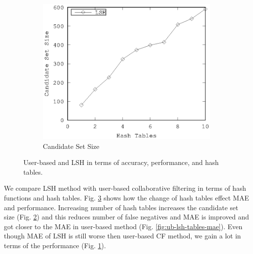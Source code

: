 \documentclass[conference]{IEEEtran}
\begin{document}
\begin{figure}[!h]
\begin{subfigure}[b]{0.225\textwidth}
                \label{fig:ub-lsh-tables-runtime}
        \end{subfigure} 
        \\
         \begin{subfigure}[b]{0.225\textwidth}
                \includegraphics[width=\textwidth]{charts/lsh-canidate-hash-tables.eps}
                \caption{Candidate Set Size}
                \label{fig:lsh-tables-candidate-size}
        \end{subfigure} 
        \caption{User-based and LSH in terms of accuracy, performance, and hash tables.}
        \label{fig:ub-lsh-tables}
\end{figure}

We compare LSH method with user-based collaborative filtering in terms of hash 
functions and hash tables. Fig. \ref{fig:ub-lsh-tables} shows how the change of
hash tables effect MAE and performance. Increasing number of hash tables 
increases the candidate set size (Fig. \ref{fig:lsh-tables-candidate-size}) 
and this reduces number of false negatives and MAE is improved and got closer 
to the MAE in user-based method (Fig. \ref{fig:ub-lsh-tables-mae}). Even though
MAE of LSH is still worse then user-based CF method, we gain a lot in terms of 
the performance (Fig. \ref{fig:ub-lsh-tables-runtime}).
\end{document}
